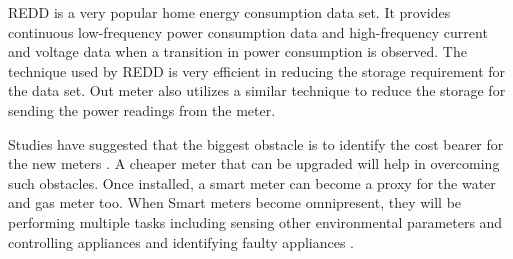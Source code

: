 REDD \cite{kolterREDDPublicData2011} is a very popular home energy consumption data set. It provides continuous low-frequency power consumption data and high-frequency current and voltage data when a transition in power consumption is observed. The technique used by REDD is very efficient in reducing the storage requirement for the data set. Out meter also utilizes a similar technique to reduce the storage for sending the power readings from the meter.

Studies have suggested that the biggest obstacle is to identify the cost bearer for the new meters \cite{Romer2012}. A cheaper meter that can be upgraded will help in overcoming such obstacles. Once installed, a smart meter can become a proxy for the water and gas meter \cite{Zivic2015} too. When Smart meters become omnipresent, they will be performing multiple tasks including sensing other environmental parameters and controlling appliances \cite{tripathyPrepaidEnergyMetering2010} \cite{ganuNPlugSmartPlug2012} and identifying faulty appliances \cite{palaniPuttingSmartMeters2014}.
